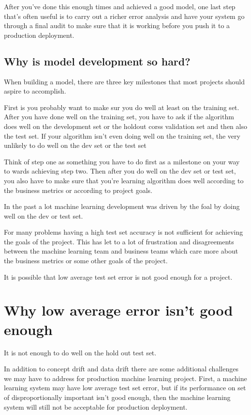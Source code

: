 After you've done this enough times and achieved a good model, one last step that's often useful is to carry out a richer error analysis and have your system go through a final audit to make sure that it is working before you push it to a production deployment.

\subsection{Why is model development so hard?}

When building a model, there are three key milestones that most projects should aspire to accomplish.

First is you probably want to make sur you do well at least on the training set.
After you have done well on the training set, you have to ask if the algorithm does well on the development set or the holdout corss validation set and then also the test set.
If your algorithm isn't even doing well on the training set, the very unlikely to do well on the dev set or the test set

Think of step one as something you have to do first as a milestone on your way to wards achieving step two.
Then after you do well on the dev set or test set, you also have to make sure that you're learning algorithm does well according to the business metrics or according to project goals.

In the past a lot machine learning development was driven by the foal by doing well on the dev or test set.

For many problems having a high test set accuracy is not sufficient for achieving the goals of the project.
This has let to a lot of frustration and disagreements between the machine learning team and business teams which care more about the business metrics or some other goals of the project.

It is possible that low average test set error is not good enough for a project.

\section{Why low average error isn't good enough}

It is not enough to do well on the hold out test set.

In addition to concept drift and data drift there are some additional challenges we may have to address for production machine learning project.
First, a machine learning system may have low average test set error, but if its performance on  set of disproportionally important isn't  good enough, then the machine learning system will still not be acceptable for production deployment.

